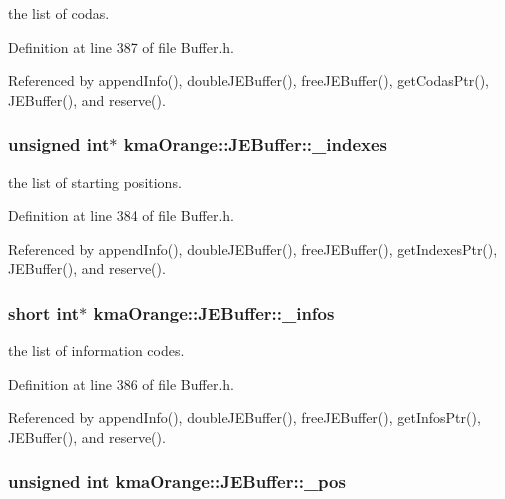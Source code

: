 the list of codas. 



Definition at line 387 of file Buffer.h.

Referenced by appendInfo(), doubleJEBuffer(), freeJEBuffer(), getCodasPtr(), JEBuffer(), and reserve().\hypertarget{classkmaOrange_1_1JEBuffer_8206c9c71650e6daad097f4ddd168acb}{
\subsubsection[{\_\-indexes}]{\setlength{\rightskip}{0pt plus 5cm}unsigned int$\ast$ {\bf kmaOrange::JEBuffer::\_\-indexes}}}
\label{classkmaOrange_1_1JEBuffer_8206c9c71650e6daad097f4ddd168acb}


the list of starting positions. 



Definition at line 384 of file Buffer.h.

Referenced by appendInfo(), doubleJEBuffer(), freeJEBuffer(), getIndexesPtr(), JEBuffer(), and reserve().\hypertarget{classkmaOrange_1_1JEBuffer_4eeb75367509a98bf49f65433684fb15}{
\subsubsection[{\_\-infos}]{\setlength{\rightskip}{0pt plus 5cm}short int$\ast$ {\bf kmaOrange::JEBuffer::\_\-infos}}}
\label{classkmaOrange_1_1JEBuffer_4eeb75367509a98bf49f65433684fb15}


the list of information codes. 



Definition at line 386 of file Buffer.h.

Referenced by appendInfo(), doubleJEBuffer(), freeJEBuffer(), getInfosPtr(), JEBuffer(), and reserve().\hypertarget{classkmaOrange_1_1JEBuffer_8ddb33c9299dd4c93fb6dd976b2b95dc}{
\subsubsection[{\_\-pos}]{\setlength{\rightskip}{0pt plus 5cm}unsigned int {\bf kmaOrange::JEBuffer::\_\-pos}}}
\label{classkmaOrange_1_1JEBuffer_8ddb33c9299dd4c93fb6dd976b2b95dc}


